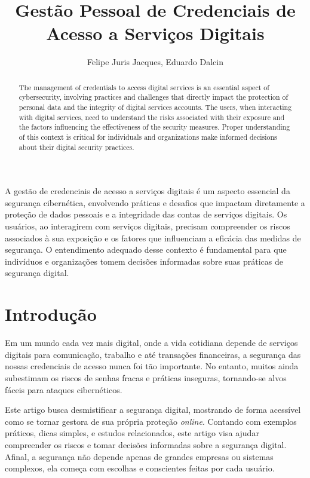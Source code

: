 \documentclass[12pt]{article}
\title{Gestão Pessoal de Credenciais de Acesso a Serviços Digitais}
\author{Felipe Juris Jacques\inst{1}, Eduardo Dalcin\inst{1} }
\begin{document}
 

\maketitle

\begin{abstract}
  The management of credentials to access digital services is an essential aspect
  of cybersecurity, involving practices and challenges that directly impact the
  protection of personal data and the integrity of digital services accounts.
  The users, when interacting with digital services, need to understand the
  risks associated with their exposure and the factors influencing the
  effectiveness of the security measures.
  Proper understanding of this context is critical for individuals and
  organizations make informed decisions about their digital security practices.
\end{abstract}
     
\begin{resumo}
  A gestão de credenciais de acesso a serviços digitais é um aspecto essencial da
  segurança cibernética, envolvendo práticas e desafios que impactam diretamente
  a proteção de dados pessoais e a integridade das contas de serviços digitais.
  Os usuários, ao interagirem com serviços digitais, precisam compreender os
  riscos associados à sua exposição e os fatores que influenciam a eficácia das
  medidas de segurança.
  O entendimento adequado desse contexto é fundamental para que indivíduos e
  organizações tomem decisões informadas sobre suas práticas de segurança digital.
\end{resumo}

\section{Introdução}

Em um mundo cada vez mais digital, onde a vida cotidiana depende de serviços digitais
para comunicação, trabalho e até transações financeiras, a segurança das nossas
credenciais de acesso nunca foi tão importante.
No entanto, muitos ainda subestimam os riscos de senhas fracas e práticas inseguras,
tornando-se alvos fáceis para ataques cibernéticos.

Este artigo busca desmistificar a segurança digital, mostrando de forma acessível como
se tornar gestora de sua própria proteção \textit{online}.
Contando com exemplos práticos, dicas simples, e estudos relacionados, este artigo
visa ajudar compreender os riscos e tomar decisões informadas sobre a segurança digital.
Afinal, a segurança não depende apenas de grandes empresas ou sistemas complexos,
ela começa com escolhas e conscientes feitas por cada usuário.
\end{document}
